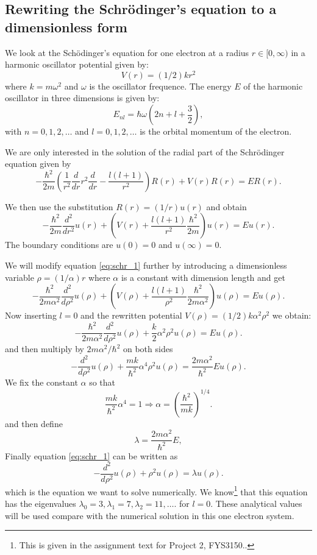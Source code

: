 \documentclass[11pt,a4wide]{article}
\begin{document}
\subsection{Rewriting the Schr\"odinger's equation to a dimensionless form} \label{sec:rewrite_sch}
We look at the Sch\"odinger's equation for one electron at a radius $r\in [0,\infty)$ in a harmonic oscillator potential given by: 
\[
V(r)= (1/2)kr^2
\]
where $k=m\omega^2$ and $\omega$ is the oscillator frequence. The energy $E$ of the harmonic oscillator in three dimensions is given by:
\[
E_{nl}=  \hbar \omega \left(2n+l+\frac{3}{2}\right),
\]
with $n=0,1,2,\dots$ and $l=0,1,2,\dots$ is the orbital momentum of the electron. 

We are only interested in the solution of the radial part of the Schr\"odinger equation given by
\begin{equation}
  -\frac{\hbar^2}{2 m} \left ( \frac{1}{r^2} \frac{d}{dr} r^2
  \frac{d}{dr} - \frac{l (l + 1)}{r^2} \right )R(r) 
     + V(r) R(r) = E R(r).
     \label{eq:schr_1}
\end{equation}

We then use the substitution $R(r) = (1/r) u(r)$ and obtain
\[
  -\frac{\hbar^2}{2 m} \frac{d^2}{dr^2} u(r) 
       + \left ( V(r) + \frac{l (l + 1)}{r^2}\frac{\hbar^2}{2 m}
                                    \right ) u(r)  = E u(r) .
\]
The boundary conditions are $u(0)=0$ and $u(\infty)=0$.

We will modify equation \ref{eq:schr_1} further by introducing a dimensionless variable $\rho = (1/\alpha) r$ where $\alpha$ is a constant with dimension length and get
% 
\[
  -\frac{\hbar^2}{2 m \alpha^2} \frac{d^2}{d\rho^2} u(\rho) 
       + \left ( V(\rho) + \frac{l (l + 1)}{\rho^2}
         \frac{\hbar^2}{2 m\alpha^2} \right ) u(\rho)  = E u(\rho) .
\]
%
Now inserting $l=0$ and the rewritten potential $V(\rho) = (1/2) k \alpha^2\rho^2$ we obtain:
\[
  -\frac{\hbar^2}{2 m \alpha^2} \frac{d^2}{d\rho^2} u(\rho) 
       + \frac{k}{2} \alpha^2\rho^2u(\rho)  = E u(\rho) .
\]
and then multiply by $2m\alpha^2/\hbar^2$ on both sides
\[
  -\frac{d^2}{d\rho^2} u(\rho) 
       + \frac{mk}{\hbar^2} \alpha^4\rho^2u(\rho)  = \frac{2m\alpha^2}{\hbar^2}E u(\rho) .
\]
We fix the constant $\alpha$ so that
\[
\frac{mk}{\hbar^2} \alpha^4 = 1 \Rightarrow \alpha = \left(\frac{\hbar^2}{mk}\right)^{1/4}.
\]
and then define 
\[
\lambda = \frac{2m\alpha^2}{\hbar^2}E,
\]
Finally equation \ref{eq:schr_1} can be written as
\begin{equation}
  -\frac{d^2}{d\rho^2} u(\rho) + \rho^2u(\rho)  = \lambda u(\rho) .
  \label{eq: sch_1D_final}
\end{equation}
which is the equation we want to solve numerically. We know\footnote{This is given in the assignment text for Project 2, FYS3150..} that this equation has the eigenvalues $\lambda_0=3,\lambda_1=7,\lambda_2=11,\dots .$ for $l=0$. These analytical values will be used compare with the numerical solution in this one electron system.
\end{document}
